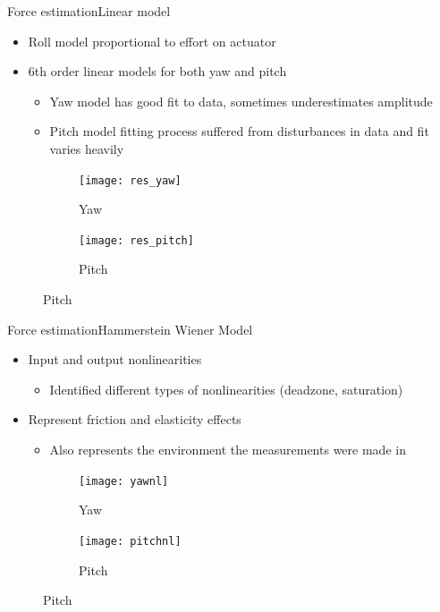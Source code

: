 \begin{frame}{Force estimation}{Linear model}
\begin{itemize}
\item Roll model proportional to effort on actuator
\item 6th order linear models for both yaw and pitch
\begin{itemize}
\item Yaw model has good fit to data, sometimes underestimates amplitude
\item Pitch model fitting process suffered from disturbances in data and fit varies heavily
\end{itemize}
\end{itemize}
\begin{figure}
\centering
    \begin{subfigure}[t]{0.49\textwidth}
        \centering
        \texttt{[image: res\_yaw]} 
        \caption{Yaw} \label{fig:yawres}
    \end{subfigure}
        \begin{subfigure}[t]{0.49\textwidth}
        \centering
        \texttt{[image: res\_pitch]} 
        \caption{Pitch} \label{fig:pitchres}
    \end{subfigure}
\end{figure}
\end{frame}

\begin{frame}{Force estimation}{Hammerstein Wiener Model}
\begin{itemize}
  \item Input and output nonlinearities
  \begin{itemize}
    \item Identified different types of nonlinearities (deadzone, saturation)
  \end{itemize}  
  \item Represent friction and elasticity effects
  \begin{itemize}
  	\item Also represents the environment the measurements were made in
  \end{itemize}
\end{itemize}

\begin{figure}
\centering
    \begin{subfigure}[t]{0.49\textwidth}
        \centering
        \texttt{[image: yawnl]} 
        \caption{Yaw} \label{fig:yawresnl}
    \end{subfigure}
        \begin{subfigure}[t]{0.49\textwidth}
        \centering
        \texttt{[image: pitchnl]} 
        \caption{Pitch} \label{fig:pitchresnl}
    \end{subfigure}
\end{figure}
\end{frame}

